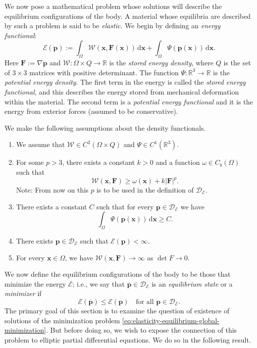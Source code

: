 We now pose a mathematical problem whose solutions will describe the equilibrium configurations of the body. A material whose equilibria are described by such a problem is said to be \emph{elastic}. We begin by defining an \emph{energy functional}:
\begin{equation}\label{eq:elasticity-total-energy-functional}
\mathcal{E}(\bm{p}):=\int_\Omega\mathcal{W}(\bm{x},\bm{F}(\bm{x}))\,\mathrm{d}\bm{x}+\int_\Omega\Psi(\bm{p}(\bm{x}))\,\mathrm{d}\bm{x}.
\end{equation}
Here $\bm{F}:=\nabla\bm{p}$ and $\mathcal{W}:\Omega\times Q\to\mathbb{R}$ is the \emph{stored energy density}, where $Q$ is the set of $3\times3$ matrices with positive determinant. The function $\Psi:\mathbb{R}^3\to\mathbb{R}$ is the \emph{potential energy density}. The first term in the energy is called the \emph{stored energy functional}, and this describes the energy stored from mechanical deformation within the material. The second term is a \emph{potential energy functional} and it is the energy from exterior forces (assumed to be conservative).

We make the following assumptions about the density functionals.\begin{enumerate}\item We assume that $\mathcal{W}\in C^2(\Omega\times Q)$ and $\Psi\in C^1(\mathbb{R}^3)$.\item For some $p>3$, there exists a constant $k>0$ and a function $\omega\in C_b(\Omega)$ such that
\begin{equation}\label{eq:elasticity-stored-energy-p-growth-bound}
\mathcal{W}(\bm{x},\bm{F})\geq\omega(\bm{x})+k|\bm{F}|^p.
\end{equation}
Note: From now on this $p$ is to be used in the definition of $\mathcal{D}_{\mathcal{E}}$.\item There exists a constant $C$ such that for every $\bm{p}\in\mathcal{D}_{\mathcal{E}}$ we have
\begin{equation}\label{eq:elasticity-potential-energy-uniform-lower-bound}
\int_\Omega\Psi(\bm{p}(\bm{x}))\,\mathrm{d}\bm{x}\geq C.
\end{equation}
\item There exists $\bm{p}\in\mathcal{D}_{\mathcal{E}}$ such that $\mathcal{E}(\bm{p})<\infty$.\item For every $\bm{x}\in\Omega$, we have $\mathcal{W}(\bm{x},\bm{F})\to\infty$ as $\det F\to0$.\end{enumerate}

We now define the equilibrium configurations of the body to be those that minimize the energy $\mathcal{E}$; i.e., we say that $\overline{\bm{p}}\in\mathcal{D}_{\mathcal{E}}$ is an \emph{equilibrium state} or a \emph{minimizer} if
\begin{equation}\label{eq:elasticity-equilibrium-global-minimization}
\mathcal{E}(\overline{\bm{p}})\leq\mathcal{E}(\bm{p})\quad\text{for all }\bm{p}\in\mathcal{D}_{\mathcal{E}}.
\end{equation}
The primary goal of this section is to examine the question of existence of solutions of the minimization problem \eqref{eq:elasticity-equilibrium-global-minimization}. But before doing so, we wish to expose the connection of this problem to elliptic partial differential equations. We do so in the following result.
